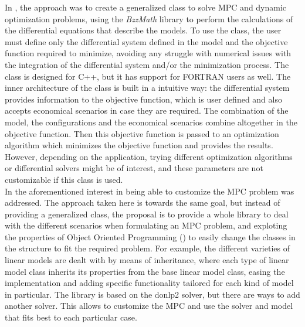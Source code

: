 In \cite{Manenti2008}, the approach was to create a generalized class to solve MPC and dynamic optimization problems, using the \emph{BzzMath} library to perform the calculations of the differential equations that describe the models. To use the class, the user must define only the differential system defined in the model and the objective function required to minimize, avoiding any struggle with numerical issues with the integration of the differential system and/or the minimization process. The class is designed for C++, but it has support for FORTRAN users as well. The inner architecture of the class is built in a intuitive way: the differential system provides information to the objective function, which is user defined and also accepts economical scenarios in case they are required. The combination of the model, the configurations and the economical scenarios combine altogether in the objective function. Then this objective function is passed to an optimization algorithm which minimizes the objective function and provides the results. However, depending on the application, trying different optimization algorithms or differential solvers might be of interest, and these parameters are not customizable if this class is used.\\

In \cite{Rosendo2009} the aforementioned interest in being able to customize the MPC problem was addressed. The approach taken here is towards the same goal, but instead of providing a generalized class, the proposal is to provide a whole library to deal with the different scenarios when formulating an MPC problem, and exploting the properties of Object Oriented Programming () to easily change the classes in the structure to fit the required problem. For example, the different varieties of linear models are dealt with by means of inheritance, where each type of linear model class inherits its properties from the base linear model class, easing the implementation and adding specific functionality tailored for each kind of model in particular. The library is based on the donlp2 solver, but there are ways to add another solver. This allows to customize the MPC and use the solver and model that fits best to each particular case. \\

